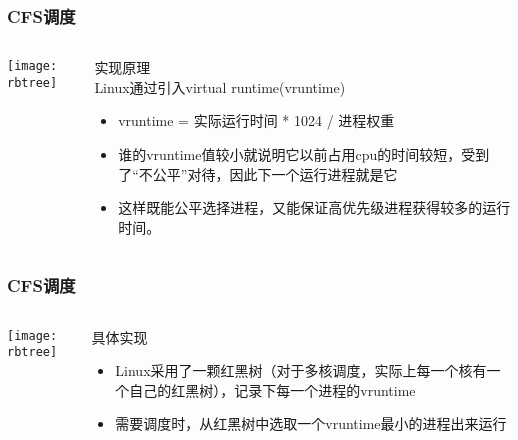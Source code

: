 \begin{frame}
	\frametitle{CFS调度}
	\begin{columns}
		\begin{column}{.4\textwidth}
			\Large \centering
			
			\texttt{[image: rbtree]}
			
		\end{column}
		
		\begin{column}{.6\textwidth}
			实现原理 \\
			Linux通过引入virtual runtime(vruntime)
			\begin{itemize}
				\item vruntime = 实际运行时间 * 1024 / 进程权重 
				\item 谁的vruntime值较小就说明它以前占用cpu的时间较短，受到了“不公平”对待，因此下一个运行进程就是它
				\item 这样既能公平选择进程，又能保证高优先级进程获得较多的运行时间。
			\end{itemize}
			
		\end{column}
	\end{columns}
\end{frame}


\begin{frame}
	\frametitle{CFS调度}
	\begin{columns}
		\begin{column}{.4\textwidth}
			\Large \centering
			
			\texttt{[image: rbtree]}
			
		\end{column}
		
		\begin{column}{.6\textwidth}
			具体实现 
			\begin{itemize}
				\item Linux采用了一颗红黑树（对于多核调度，实际上每一个核有一个自己的红黑树），记录下每一个进程的vruntime
				\item 需要调度时，从红黑树中选取一个vruntime最小的进程出来运行
			\end{itemize}
			
		\end{column}
	\end{columns}
\end{frame}


